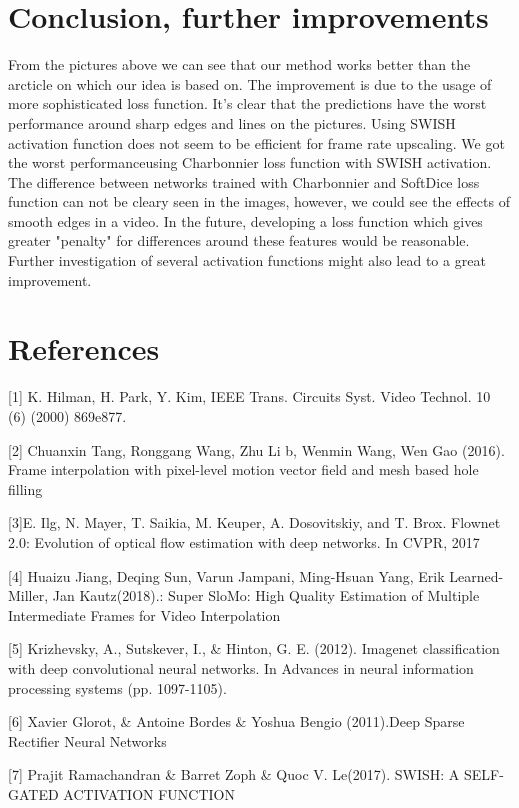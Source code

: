 \documentclass{article}
\begin{document}
\section{Conclusion, further improvements}
From the pictures above we can see that our method works better than the arcticle on which our idea is based on. The improvement is due to the usage of more sophisticated loss function. It's clear that the predictions have the worst performance around sharp edges and lines on the pictures. Using SWISH activation function does not seem to be efficient for frame rate upscaling. We got the worst performanceusing Charbonnier loss function with SWISH activation. The difference between networks trained with Charbonnier and SoftDice loss function can not be cleary seen in the images, however, we could see the effects of smooth edges in a video. In the future, developing a loss function which gives greater "penalty" for differences around these features would be reasonable. Further investigation of several activation functions might also lead to a great improvement.

\section*{References}
\medskip

\small

[1] K. Hilman, H. Park, Y. Kim, IEEE Trans. Circuits Syst. Video Technol.
10 (6) (2000) 869e877.

[2] Chuanxin Tang, Ronggang Wang, Zhu Li b, Wenmin Wang, Wen Gao (2016). Frame interpolation with pixel-level motion vector field and mesh based
hole filling

[3]E. Ilg, N. Mayer, T. Saikia, M. Keuper, A. Dosovitskiy, and
T. Brox. Flownet 2.0: Evolution of optical flow estimation
with deep networks. In CVPR, 2017

[4] Huaizu Jiang, Deqing Sun, Varun Jampani, Ming-Hsuan Yang, Erik Learned-Miller, Jan Kautz(2018).: 
Super SloMo: High Quality Estimation of Multiple Intermediate Frames
for Video Interpolation

[5] Krizhevsky, A., Sutskever, I., \& Hinton, G. E. (2012).
Imagenet classification with deep convolutional neural
networks. In Advances in neural information processing
systems (pp. 1097-1105).

[6] Xavier Glorot, \& Antoine Bordes \& Yoshua Bengio (2011).Deep Sparse Rectifier Neural Networks

[7] Prajit Ramachandran \& Barret Zoph \& Quoc V. Le(2017).
SWISH: A SELF-GATED ACTIVATION FUNCTION
\end{document}

